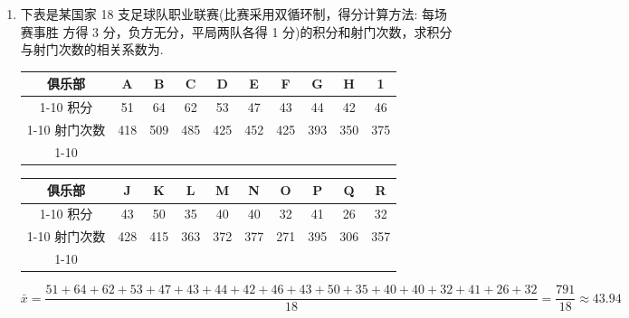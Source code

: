 \begin{enumerate}
\begin{jieda}
$
\begin{aligned}
S_{yy} &= \sum (y_i - \bar{y})^2 \\
&= (-8)^2 + (-6)^2 + (-5)^2 + (-3)^2 + (-1)^2 + 1^2 + 3^2 + 5^2 + 5^2 + 9^2 \\
&= 64+36+25+9+1+1+9+25+25+81 = 276
\end{aligned}
$

$
r = \dfrac{S_{xy}}{\sqrt{S_{xx}S_{yy}}} = \dfrac{-95}{\sqrt{46 \times 276}}
$

$
46 \times 276 = 12696
$
$
\sqrt{12696} \approx 112.68
$
$
r \approx \dfrac{-95}{112.68} \approx -0.843
$

因此，职工年迟到次数与住地远近之间的相关系数为 $-0.843$.
    \end{jieda}
    
    \item 下表是某国家 18 支足球队职业联赛(比赛采用双循环制，得分计算方法: 每场赛事胜 方得 3 分，负方无分，平局两队各得 1 分)的积分和射门次数，求积分与射门次数的相关系数为.
    
    \begin{center}
    \begin{tabular}{|c|c|c|c|c|c|c|c|c|c|}
    \hline
    俱乐部 & A & B & C & D & E & F & G & H & 1 \\
    \cline{1-10}
    积分 & 51 & 64 & 62 & 53 & 47 & 43 & 44 & 42 & 46 \\
    \cline{1-10}
    射门次数 & 418 & 509 & 485 & 425 & 452 & 425 & 393 & 350 & 375 \\
    \cline{1-10}
    \hline
    \end{tabular}
    
    \end{center}
    
    \begin{center}
    \begin{tabular}{|c|c|c|c|c|c|c|c|c|c|}
    \hline
    俱乐部 & J & K & L & M & N & O & P & Q & R \\
    \cline{1-10}
    积分 & 43 & 50 & 35 & 40 & 40 & 32 & 41 & 26 & 32 \\
    \cline{1-10}
    射门次数 & 428 & 415 & 363 & 372 & 377 & 271 & 395 & 306 & 357 \\
    \cline{1-10}
    \hline
    \end{tabular}
    \end{center}
    \begin{jieda}
        $\bar{x} = \dfrac{{51} + {64} + {62} + {53} + {47} + {43} + {44} + {42} + {46} + {43} + {50} + {35} + {40} + {40} + {32} + {41} + {26} + {32}}{18} = \dfrac{791}{18} \approx  {43.94}$
        

\end{jieda}
\end{enumerate}
